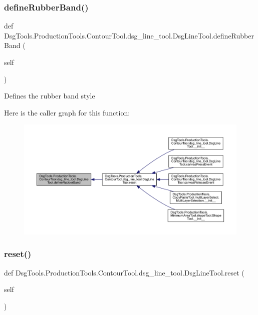\subsubsection{\texorpdfstring{define\+Rubber\+Band()}{defineRubberBand()}}
{\footnotesize\ttfamily def Dsg\+Tools.\+Production\+Tools.\+Contour\+Tool.\+dsg\+\_\+line\+\_\+tool.\+Dsg\+Line\+Tool.\+define\+Rubber\+Band (\begin{DoxyParamCaption}\item[{}]{self }\end{DoxyParamCaption})}

\begin{DoxyVerb}Defines the rubber band style
\end{DoxyVerb}
 Here is the caller graph for this function\+:
\nopagebreak
\begin{figure}[H]
\begin{center}
\leavevmode
\includegraphics[width=350pt]{class_dsg_tools_1_1_production_tools_1_1_contour_tool_1_1dsg__line__tool_1_1_dsg_line_tool_a116f16922c4a8312da82c30147964be0_icgraph}
\end{center}
\end{figure}
\mbox{\label{class_dsg_tools_1_1_production_tools_1_1_contour_tool_1_1dsg__line__tool_1_1_dsg_line_tool_a71aed4c442ef705084b8ca8193d60a24}} 
\subsubsection{\texorpdfstring{reset()}{reset()}}
{\footnotesize\ttfamily def Dsg\+Tools.\+Production\+Tools.\+Contour\+Tool.\+dsg\+\_\+line\+\_\+tool.\+Dsg\+Line\+Tool.\+reset (\begin{DoxyParamCaption}\item[{}]{self }\end{DoxyParamCaption})}

